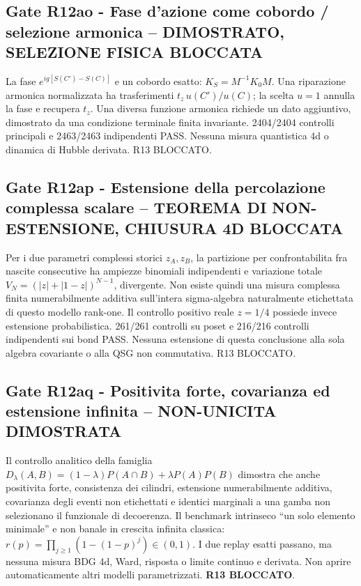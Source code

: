 \documentclass[11pt,a4paper]{article}
\begin{document}
\subsection*{Gate R12ao - Fase d'azione come cobordo / selezione armonica -- DIMOSTRATO, SELEZIONE FISICA BLOCCATA}
La fase $e^{ig[S(C')-S(C)]}$ e un cobordo esatto: $K_S=M^{-1}K_0M$. Una riparazione armonica normalizzata ha trasferimenti $t_z\,u(C')/u(C)$; la scelta $u=1$ annulla la fase e recupera $t_z$. Una diversa funzione armonica richiede un dato aggiuntivo, dimostrato da una condizione terminale finita invariante. 2404/2404 controlli principali e 2463/2463 indipendenti PASS. Nessuna misura quantistica 4d o dinamica di Hubble derivata. R13 BLOCCATO.

\subsection*{Gate R12ap - Estensione della percolazione complessa scalare -- TEOREMA DI NON-ESTENSIONE, CHIUSURA 4D BLOCCATA}
Per i due parametri complessi storici $z_A,z_B$, la partizione per confrontabilita fra nascite consecutive ha ampiezze binomiali indipendenti e variazione totale $V_N=(|z|+|1-z|)^{N-1}$, divergente. Non esiste quindi una misura complessa finita numerabilmente additiva sull'intera sigma-algebra naturalmente etichettata di questo modello rank-one. Il controllo positivo reale $z=1/4$ possiede invece estensione probabilistica. 261/261 controlli su poset e 216/216 controlli indipendenti sui bond PASS. Nessuna estensione di questa conclusione alla sola algebra covariante o alla QSG non commutativa. R13 BLOCCATO.

\subsection*{Gate R12aq - Positivita forte, covarianza ed estensione infinita -- NON-UNICITA DIMOSTRATA}
Il controllo analitico della famiglia $D_\lambda(A,B)=(1-\lambda)P(A\cap B)+\lambda P(A)P(B)$ dimostra che anche positivita forte, consistenza dei cilindri, estensione numerabilmente additiva, covarianza degli eventi non etichettati e identici marginali a una gamba non selezionano il funzionale di decoerenza. Il benchmark intrinseco ``un solo elemento minimale'' e non banale in crescita infinita classica: $r(p)=\prod_{j\ge1}(1-(1-p)^j)\in(0,1)$. I due replay esatti passano, ma nessuna misura BDG 4d, Ward, risposta o limite continuo e derivata. Non aprire automaticamente altri modelli parametrizzati. \textbf{R13 BLOCCATO}.
\end{document}
